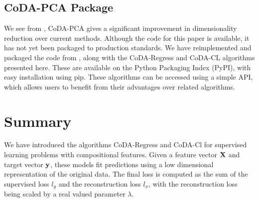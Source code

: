 \subsection{CoDA-PCA Package}

We see from \citep{Avalos2018}, CoDA-PCA gives a significant improvement in dimensionality reduction over current methods. Although the code for this paper is available, it has not yet been packaged to production standards. We have reimplemented and packaged the code from \citep{Avalos2018}, along with the CoDA-Regress and CoDA-CL algorithms presented here. These are available on the Python Packaging Index (PyPI), with easy installation using pip. These algorithms can be accessed using a simple API, which allows users to benefit from their advantages over related algorithms.   



\section{Summary}
We have introduced the algorithms CoDA-Regress and CoDA-Cl for supervised learning problems with compositional features. 
Given a feature vector $\bf X$ and target vector $\bf y$, these models fit predictions using a low dimensional representation of the original data. The final loss is computed as the sum of the supervised loss $l_{y}$ and the reconstruction loss $l_{x}$, with the reconstruction loss being scaled by a real valued parameter $\lambda$.  



